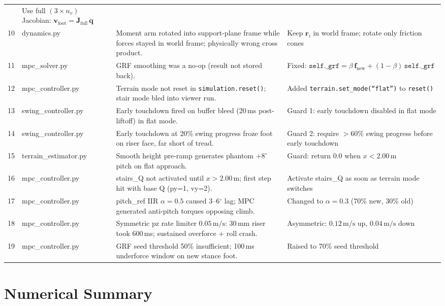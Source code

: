 \documentclass[12pt,a4paper]{report}
\newcommand{\vect}[1]{\bm{#1}}
\newcommand{\mat}[1]{\mathbf{#1}}
\begin{document}
\begin{longtable}{p{0.4cm}p{3.2cm}p{5cm}p{5.5cm}}
  & Use full $(3\times n_v)$ Jacobian: $\vect{v}_\text{foot} = \mat{J}_\text{full}\,\dot{\vect{q}}$ \\
10 & dynamics.py & Moment arm rotated into support-plane frame while forces stayed in world frame; physically wrong cross product.
   & Keep $\vect{r}_i$ in world frame; rotate only friction cones \\
11 & mpc\_solver.py & GRF smoothing was a no-op (result not stored back).
   & Fixed: $\texttt{self.\_grf} = \beta\,\vect{f}_\text{new} + (1-\beta)\,\texttt{self.\_grf}$ \\
12 & mpc\_controller.py & Terrain mode not reset in \texttt{simulation.reset()}; stair mode bled into viewer run.
   & Added \texttt{terrain.set\_mode(``flat'')} to \texttt{reset()} \\
13 & swing\_controller.py & Early touchdown fired on buffer bleed (20\,ms post-liftoff) in flat mode.
   & Guard 1: early touchdown disabled in flat mode \\
14 & swing\_controller.py & Early touchdown at 20\% swing progress froze foot on riser face, far short of tread.
   & Guard 2: require $>60\%$ swing progress before early touchdown \\
15 & terrain\_estimator.py & Smooth height pre-ramp generates phantom $+8^\circ$ pitch on flat approach.
   & Guard: return 0.0 when $x < 2.00\,\text{m}$ \\
16 & mpc\_controller.py & stairs\_Q not activated until $x > 2.00\,\text{m}$; first step hit with base Q (py=1, vy=2).
   & Activate stairs\_Q as soon as terrain mode switches \\
17 & mpc\_controller.py & pitch\_ref IIR $\alpha=0.5$ caused 3--6$^\circ$ lag; MPC generated anti-pitch torques opposing climb.
   & Changed to $\alpha=0.3$ (70\% new, 30\% old) \\
18 & mpc\_controller.py & Symmetric pz rate limiter $0.05\,\text{m/s}$: 30\,mm riser took 600\,ms; sustained overforce + roll crash.
   & Asymmetric: $0.12\,\text{m/s}$ up, $0.04\,\text{m/s}$ down \\
19 & mpc\_controller.py & GRF seed threshold 50\% insufficient; 100\,ms underforce window on new stance foot.
   & Raised to 70\% seed threshold \\
\end{longtable}

\chapter{Numerical Summary}
\end{document}
